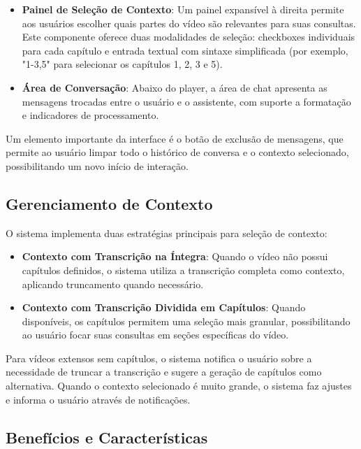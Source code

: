 \documentclass[tcc,capa]{texufpel}
\begin{document}
\begin{itemize}
    
    
    \item \textbf{Painel de Seleção de Contexto}: Um painel expansível à direita permite aos usuários escolher quais partes do vídeo são relevantes para suas consultas. Este componente oferece duas modalidades de seleção: checkboxes individuais para cada capítulo e entrada textual com sintaxe simplificada (por exemplo, "1-3,5" para selecionar os capítulos 1, 2, 3 e 5).
    
    \item \textbf{Área de Conversação}: Abaixo do player, a área de chat apresenta as mensagens trocadas entre o usuário e o assistente, com suporte a formatação e indicadores de processamento.
\end{itemize}

Um elemento importante da interface é o botão de exclusão de mensagens, que permite ao usuário limpar todo o histórico de conversa e o contexto selecionado, possibilitando um novo início de interação.

\subsection{Gerenciamento de Contexto}

O sistema implementa duas estratégias principais para seleção de contexto:

\begin{itemize}
    \item \textbf{Contexto com Transcrição na Íntegra}: Quando o vídeo não possui capítulos definidos, o sistema utiliza a transcrição completa como contexto, aplicando truncamento quando necessário.
    
    \item \textbf{Contexto com Transcrição Dividida em Capítulos}: Quando disponíveis, os capítulos permitem uma seleção mais granular, possibilitando ao usuário focar suas consultas em seções específicas do vídeo.
\end{itemize}

Para vídeos extensos sem capítulos, o sistema notifica o usuário sobre a necessidade de truncar a transcrição e sugere a geração de capítulos como alternativa. Quando o contexto selecionado é muito grande, o sistema faz ajustes e informa o usuário através de notificações.

\subsection{Benefícios e Características}
\end{document}
